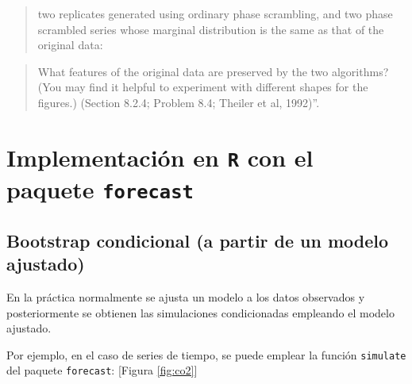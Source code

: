 \documentclass[]{book}
\newenvironment{Shaded}{\begin{snugshade}}{\end{snugshade}}
\newcommand{\KeywordTok}[1]{\textcolor[rgb]{0.13,0.29,0.53}{\textbf{#1}}}
\newcommand{\DecValTok}[1]{\textcolor[rgb]{0.00,0.00,0.81}{#1}}
\newcommand{\StringTok}[1]{\textcolor[rgb]{0.31,0.60,0.02}{#1}}
\newcommand{\CommentTok}[1]{\textcolor[rgb]{0.56,0.35,0.01}{\textit{#1}}}
\newcommand{\OperatorTok}[1]{\textcolor[rgb]{0.81,0.36,0.00}{\textbf{#1}}}
\newcommand{\NormalTok}[1]{#1}
\theoremstyle{definition}
\theoremstyle{definition}
\theoremstyle{definition}
\theoremstyle{remark}
\begin{document}
\begin{quote}
two replicates generated using ordinary phase scrambling, and two phase
scrambled series whose marginal distribution is the same as that of the
original data:
\end{quote}

\begin{Shaded}
\end{Shaded}

\begin{quote}
What features of the original data are preserved by the two algorithms?
(You may find it helpful to experiment with different shapes for the
figures.) (Section 8.2.4; Problem 8.4; Theiler et al, 1992)''.
\end{quote}

\section{\texorpdfstring{Implementación en \texttt{R} con el paquete
\texttt{forecast}}{Implementación en R con el paquete forecast}}\label{implementacion-en-r-con-el-paquete-forecast}

\subsection{Bootstrap condicional (a partir de un modelo
ajustado)}\label{bootstrap-condicional-a-partir-de-un-modelo-ajustado}

En la práctica normalmente se ajusta un modelo a los datos observados y
posteriormente se obtienen las simulaciones condicionadas empleando el
modelo ajustado.

Por ejemplo, en el caso de series de tiempo, se puede emplear la función
\texttt{simulate} del paquete \texttt{forecast}: {[}Figura
\ref{fig:co2}{]}
\end{document}
